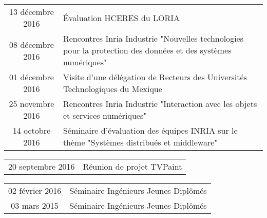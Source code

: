 \documentclass[]{deedy-resume-openfont}
\begin{document}
\descript{}
\begin{tabular}{cp{150mm}}
13 décembre 2016       & Évaluation HCERES du LORIA\\
08 décembre 2016       & Rencontres Inria Industrie "Nouvelles technologies pour la protection des données et des systèmes numériques"\\
01 décembre 2016       & Visite d'une délégation de Recteurs des Universités Technologiques du Mexique\\
25 novembre 2016       & Rencontres Inria Industrie "Interaction avec les objets et services numériques"\\
14 octobre 2016        & Séminaire d'évaluation des équipes INRIA sur le thème "Systèmes distribués et middleware"\\
\end{tabular}
\sectionsep
\sectionsep

\descript{}
\begin{tabular}{cp{150mm}}
20 septembre 2016      & Réunion de projet TVPaint\\
\end{tabular}
\sectionsep

\descript{}
\begin{tabular}{cl}
02 février 2016        & Séminaire Ingénieurs Jeunes Diplômés\\
03 mars 2015           & Séminaire Ingénieurs Jeunes Diplômés\\
\end{tabular}
\sectionsep


\end{document}
